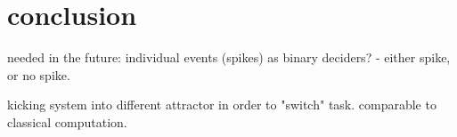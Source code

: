 \section{conclusion}

	needed in the future: individual events (spikes) as binary deciders? - either spike, or no spike.
	
	kicking system into different attractor in order to "switch" task. comparable to classical computation. 